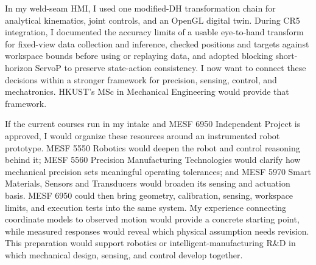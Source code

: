 In my weld-seam HMI, I used one modified-DH transformation chain for analytical kinematics, joint controls, and an OpenGL digital twin. During CR5 integration, I documented the accuracy limits of a usable eye-to-hand transform for fixed-view data collection and inference, checked positions and targets against workspace bounds before using or replaying data, and adopted blocking short-horizon ServoP to preserve state-action consistency. I now want to connect these decisions within a stronger framework for precision, sensing, control, and mechatronics. HKUST's MSc in Mechanical Engineering would provide that framework.

If the current courses run in my intake and MESF 6950 Independent Project is approved, I would organize these resources around an instrumented robot prototype. MESF 5550 Robotics would deepen the robot and control reasoning behind it; MESF 5560 Precision Manufacturing Technologies would clarify how mechanical precision sets meaningful operating tolerances; and MESF 5970 Smart Materials, Sensors and Transducers would broaden its sensing and actuation basis. MESF 6950 could then bring geometry, calibration, sensing, workspace limits, and execution tests into the same system. My experience connecting coordinate models to observed motion would provide a concrete starting point, while measured responses would reveal which physical assumption needs revision. This preparation would support robotics or intelligent-manufacturing R\&D in which mechanical design, sensing, and control develop together.
